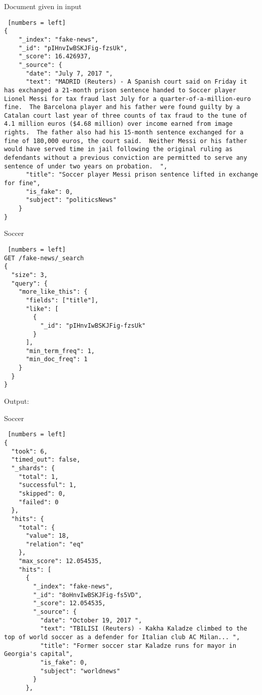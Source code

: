 \begin{algorithm}[h!]
\caption{Document given in input}
\begin{lstlisting} [numbers = left]
{
    "_index": "fake-news",
    "_id": "pIHnvIwBSKJFig-fzsUk",
    "_score": 16.426937,
    "_source": {
      "date": "July 7, 2017 ",
      "text": "MADRID (Reuters) - A Spanish court said on Friday it has exchanged a 21-month prison sentence handed to Soccer player Lionel Messi for tax fraud last July for a quarter-of-a-million-euro fine.  The Barcelona player and his father were found guilty by a Catalan court last year of three counts of tax fraud to the tune of 4.1 million euros ($4.68 million) over income earned from image rights.  The father also had his 15-month sentence exchanged for a fine of 180,000 euros, the court said.  Neither Messi or his father would have served time in jail following the original ruling as defendants without a previous conviction are permitted to serve any sentence of under two years on probation.  ",
      "title": "Soccer player Messi prison sentence lifted in exchange for fine",
      "is_fake": 0,
      "subject": "politicsNews"
    }
}
\end{lstlisting}
\end{algorithm}

\newpage

\begin{algorithm}[h!]
\caption{Soccer}
\begin{lstlisting} [numbers = left]
GET /fake-news/_search
{
  "size": 3,
  "query": {
    "more_like_this": {
      "fields": ["title"],
      "like": [
        {
          "_id": "pIHnvIwBSKJFig-fzsUk"
        }
      ],
      "min_term_freq": 1,
      "min_doc_freq": 1
    }
  }
}
\end{lstlisting}
\end{algorithm}

\newpage

Output:
\begin{algorithm}[h!]
\caption{Soccer}
\begin{lstlisting} [numbers = left]
{
  "took": 6,
  "timed_out": false,
  "_shards": {
    "total": 1,
    "successful": 1,
    "skipped": 0,
    "failed": 0
  },
  "hits": {
    "total": {
      "value": 18,
      "relation": "eq"
    },
    "max_score": 12.054535,
    "hits": [
      {
        "_index": "fake-news",
        "_id": "8oHnvIwBSKJFig-fs5VD",
        "_score": 12.054535,
        "_source": {
          "date": "October 19, 2017 ",
          "text": "TBILISI (Reuters) - Kakha Kaladze climbed to the top of world soccer as a defender for Italian club AC Milan... ",
          "title": "Former soccer star Kaladze runs for mayor in Georgia's capital",
          "is_fake": 0,
          "subject": "worldnews"
        }
      },
      
\end{lstlisting}
\end{algorithm}


